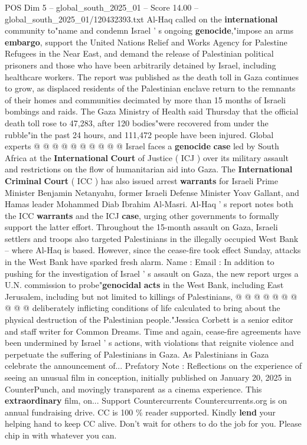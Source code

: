 \begin{textsample}{POS Dim 5 – global\_south\_2025\_01 – Score 14.00 – global\_south\_2025\_01/120432393.txt}
Al-Haq called on the \textbf{international} community to"name and condemn Israel ' s ongoing \textbf{genocide},"impose an arms \textbf{embargo}, support the United Nations Relief and Works Agency for Palestine Refugees in the Near East, and demand the release of Palestinian political prisoners and those who have been arbitrarily detained by Israel, including healthcare workers.
The report was published as the death toll in Gaza continues to grow, as displaced residents of the Palestinian enclave return to the remnants of their homes and communities decimated by more than 15 months of Israeli bombings and raids.
The Gaza Ministry of Health said Thursday that the official death toll rose to 47,283, after 120 bodies"were recovered from under the rubble"in the past 24 hours, and 111,472 people have been injured.
Global experts @ @ @ @ @ @ @ @ @ @ Israel faces a \textbf{genocide} \textbf{case} led by South Africa at the \textbf{International} \textbf{Court} of Justice ( ICJ ) over its military assault and restrictions on the flow of humanitarian aid into Gaza.
The \textbf{International} \textbf{Criminal} \textbf{Court} ( ICC ) has also issued arrest \textbf{warrants} for Israeli Prime Minister Benjamin Netanyahu, former Israeli Defense Minister Yoav Gallant, and Hamas leader Mohammed Diab Ibrahim Al-Masri.
Al-Haq ' s report notes both the ICC \textbf{warrants} and the ICJ \textbf{case}, urging other governments to formally support the latter effort.
Throughout the 15-month assault on Gaza, Israeli settlers and troops also targeted Palestinians in the illegally occupied West Bank -- where Al-Haq is based.
However, since the cease-fire took effect Sunday, attacks in the West Bank have sparked fresh alarm.
Name : Email : In addition to pushing for the investigation of Israel ' s assault on Gaza, the new report urges a U.N. commission to probe"\textbf{genocidal} \textbf{acts} in the West Bank, including East Jerusalem, including but not limited to killings of Palestinians, @ @ @ @ @ @ @ @ @ @ deliberately inflicting conditions of life calculated to bring about the physical destruction of the Palestinian people."Jessica Corbett is a senior editor and staff writer for Common Dreams.
Time and again, cease-fire agreements have been undermined by Israel ' s actions, with violations that reignite violence and perpetuate the suffering of Palestinians in Gaza.
As Palestinians in Gaza celebrate the announcement of...
Prefatory Note : Reflections on the experience of seeing an unusual film in conception, initially published on January 20, 2025 in CounterPunch, and movingly transparent as a cinema experience.
This \textbf{extraordinary} film, on...
Support Countercurrents Countercurrents.org is on annual fundraising drive.
CC is 100 \% reader supported.
Kindly \textbf{lend} your helping hand to keep CC alive.
Don't wait for others to do the job for you.
Please chip in with whatever you can.

\end{textsample}
